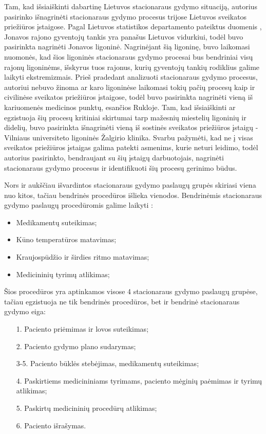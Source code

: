 Tam, kad išsiaiškinti dabartinę Lietuvos stacionaraus gydymo situaciją, autorius pasirinko išnagrinėti stacionaraus gydymo procesus trijose Lietuvos sveikatos priežiūros įstaigose. Pagal Lietuvos statistikos departamento pateiktus duomenis \cite{Gyvento2017}, Jonavos rajono gyventojų tankis yra panašus Lietuvos vidurkiui, todėl buvo pasirinkta nagrinėti Jonavos ligoninė. Nagrinėjant šią ligoninę, buvo laikomasi nuomonės, kad šios ligoninės stacionaraus gydymo procesai bus bendriniai visų rajonų ligoninėms, išskyrus tuos rajonus, kurių gyventojų tankių rodiklius galime laikyti ekstremizmais. Prieš pradedant analizuoti stacionaraus gydymo procesus, autoriui nebuvo žinoma ar karo ligoninėse laikomasi tokių pačių procesų kaip ir civilinėse sveikatos priežiūros įstaigose, todėl buvo pasirinkta nagrinėti vieną iš kariuomenės medicinos punktų, esančios Rukloje. Tam, kad išsiaiškinti ar egzistuoja šių procesų kritiniai skirtumai tarp mažesnių miestelių ligoninių ir didelių, buvo pasirinkta išnagrinėti vieną iš sostinės sveikatos priežiūros įstaigų - Vilniaus universiteto ligoninės Žalgirio klinika. Svarbu pažymėti, kad ne į visas sveikatos priežiūros įstaigas galima patekti asmenims, kurie neturi leidimo, todėl autorius pasirinkto, bendraujant su šių įstaigų darbuotojais, nagrinėti stacionaraus gydymo procesus ir identifikuoti šių procesų gerinimo būdus.

Nors ir aukščiau išvardintos stacionaraus gydymo paslaugų grupės skiriasi viena nuo kitos, tačiau bendrinės procedūros išlieka vienodos. Bendrinėmis stacionaraus gydymo paslaugų procedūromis galime laikyti \cite{Gautam}: 
\begin{itemize}
    \item Medikamentų suteikimas;
    \item Kūno temperatūros matavimas;
    \item Kraujospūdžio ir širdies ritmo matavimas;
    \item Medicininių tyrimų atlikimas;  
\end{itemize}
Šios procedūros yra aptinkamos visose 4 stacionaraus gydymo paslaugų grupėse, tačiau egzistuoja ne tik bendrinės procedūros, bet ir bendrinė stacionaraus gydymo eiga:
\begin{itemize}
    \item [1.] Paciento priėmimas ir lovos suteikimas;
    \item [2.] Paciento gydymo plano sudarymas;
    \item [3-5.] Paciento būklės stebėjimas, medikamentų suteikimas;
    \item [4.] Paskirtiems medicininiams tyrimams, paciento mėginių paėmimas ir tyrimų atlikimas;
    \item [5.] Paskirtų medicininių procedūrų atlikimas;
    \item [6.] Paciento išrašymas.
\end{itemize}

